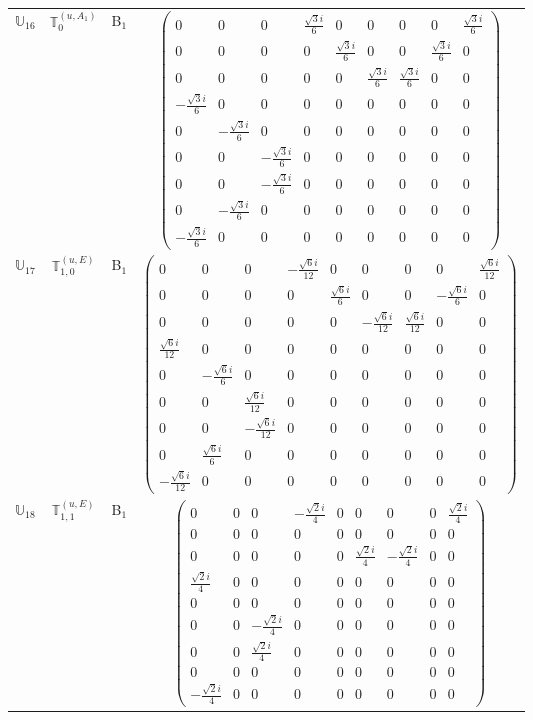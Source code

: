 \documentclass[fleqn,10pt,landscape]{article}
\begin{document}
\begin{itemize}
\begin{center}
\begin{longtable}{c|c|c|c}
$ \mathbb{U}_{16} $ & $\mathbb{T}_{0}^{(u,A_{1})}$ & B$_{1}$ & $\begin{pmatrix} 0 & 0 & 0 & \frac{\sqrt{3} i}{6} & 0 & 0 & 0 & 0 & \frac{\sqrt{3} i}{6} \\ 0 & 0 & 0 & 0 & \frac{\sqrt{3} i}{6} & 0 & 0 & \frac{\sqrt{3} i}{6} & 0 \\ 0 & 0 & 0 & 0 & 0 & \frac{\sqrt{3} i}{6} & \frac{\sqrt{3} i}{6} & 0 & 0 \\ - \frac{\sqrt{3} i}{6} & 0 & 0 & 0 & 0 & 0 & 0 & 0 & 0 \\ 0 & - \frac{\sqrt{3} i}{6} & 0 & 0 & 0 & 0 & 0 & 0 & 0 \\ 0 & 0 & - \frac{\sqrt{3} i}{6} & 0 & 0 & 0 & 0 & 0 & 0 \\ 0 & 0 & - \frac{\sqrt{3} i}{6} & 0 & 0 & 0 & 0 & 0 & 0 \\ 0 & - \frac{\sqrt{3} i}{6} & 0 & 0 & 0 & 0 & 0 & 0 & 0 \\ - \frac{\sqrt{3} i}{6} & 0 & 0 & 0 & 0 & 0 & 0 & 0 & 0 \end{pmatrix}$ \\
$ \mathbb{U}_{17} $ & $\mathbb{T}_{1,0}^{(u,E)}$ & B$_{1}$ & $\begin{pmatrix} 0 & 0 & 0 & - \frac{\sqrt{6} i}{12} & 0 & 0 & 0 & 0 & \frac{\sqrt{6} i}{12} \\ 0 & 0 & 0 & 0 & \frac{\sqrt{6} i}{6} & 0 & 0 & - \frac{\sqrt{6} i}{6} & 0 \\ 0 & 0 & 0 & 0 & 0 & - \frac{\sqrt{6} i}{12} & \frac{\sqrt{6} i}{12} & 0 & 0 \\ \frac{\sqrt{6} i}{12} & 0 & 0 & 0 & 0 & 0 & 0 & 0 & 0 \\ 0 & - \frac{\sqrt{6} i}{6} & 0 & 0 & 0 & 0 & 0 & 0 & 0 \\ 0 & 0 & \frac{\sqrt{6} i}{12} & 0 & 0 & 0 & 0 & 0 & 0 \\ 0 & 0 & - \frac{\sqrt{6} i}{12} & 0 & 0 & 0 & 0 & 0 & 0 \\ 0 & \frac{\sqrt{6} i}{6} & 0 & 0 & 0 & 0 & 0 & 0 & 0 \\ - \frac{\sqrt{6} i}{12} & 0 & 0 & 0 & 0 & 0 & 0 & 0 & 0 \end{pmatrix}$ \\
$ \mathbb{U}_{18} $ & $\mathbb{T}_{1,1}^{(u,E)}$ & B$_{1}$ & $\begin{pmatrix} 0 & 0 & 0 & - \frac{\sqrt{2} i}{4} & 0 & 0 & 0 & 0 & \frac{\sqrt{2} i}{4} \\ 0 & 0 & 0 & 0 & 0 & 0 & 0 & 0 & 0 \\ 0 & 0 & 0 & 0 & 0 & \frac{\sqrt{2} i}{4} & - \frac{\sqrt{2} i}{4} & 0 & 0 \\ \frac{\sqrt{2} i}{4} & 0 & 0 & 0 & 0 & 0 & 0 & 0 & 0 \\ 0 & 0 & 0 & 0 & 0 & 0 & 0 & 0 & 0 \\ 0 & 0 & - \frac{\sqrt{2} i}{4} & 0 & 0 & 0 & 0 & 0 & 0 \\ 0 & 0 & \frac{\sqrt{2} i}{4} & 0 & 0 & 0 & 0 & 0 & 0 \\ 0 & 0 & 0 & 0 & 0 & 0 & 0 & 0 & 0 \\ - \frac{\sqrt{2} i}{4} & 0 & 0 & 0 & 0 & 0 & 0 & 0 & 0 \end{pmatrix}$ \\

\end{longtable}
\end{center}
\end{itemize}
\end{document}
